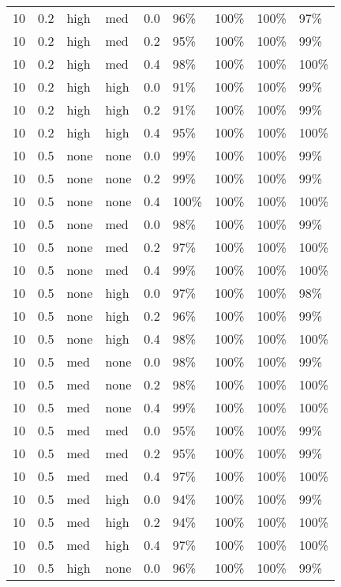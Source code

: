 \begin{longtable}{rrllrllll}
  10 & 0.2 & high & med & 0.0 & 96\% & 100\% & 100\% & 97\% \\ 
  10 & 0.2 & high & med & 0.2 & 95\% & 100\% & 100\% & 99\% \\ 
  10 & 0.2 & high & med & 0.4 & 98\% & 100\% & 100\% & 100\% \\ 
  10 & 0.2 & high & high & 0.0 & 91\% & 100\% & 100\% & 99\% \\ 
  10 & 0.2 & high & high & 0.2 & 91\% & 100\% & 100\% & 99\% \\ 
  10 & 0.2 & high & high & 0.4 & 95\% & 100\% & 100\% & 100\% \\ 
  10 & 0.5 & none & none & 0.0 & 99\% & 100\% & 100\% & 99\% \\ 
  10 & 0.5 & none & none & 0.2 & 99\% & 100\% & 100\% & 99\% \\ 
  10 & 0.5 & none & none & 0.4 & 100\% & 100\% & 100\% & 100\% \\ 
  10 & 0.5 & none & med & 0.0 & 98\% & 100\% & 100\% & 99\% \\ 
  10 & 0.5 & none & med & 0.2 & 97\% & 100\% & 100\% & 100\% \\ 
  10 & 0.5 & none & med & 0.4 & 99\% & 100\% & 100\% & 100\% \\ 
  10 & 0.5 & none & high & 0.0 & 97\% & 100\% & 100\% & 98\% \\ 
  10 & 0.5 & none & high & 0.2 & 96\% & 100\% & 100\% & 99\% \\ 
  10 & 0.5 & none & high & 0.4 & 98\% & 100\% & 100\% & 100\% \\ 
  10 & 0.5 & med & none & 0.0 & 98\% & 100\% & 100\% & 99\% \\ 
  10 & 0.5 & med & none & 0.2 & 98\% & 100\% & 100\% & 100\% \\ 
  10 & 0.5 & med & none & 0.4 & 99\% & 100\% & 100\% & 100\% \\ 
  10 & 0.5 & med & med & 0.0 & 95\% & 100\% & 100\% & 99\% \\ 
  10 & 0.5 & med & med & 0.2 & 95\% & 100\% & 100\% & 99\% \\ 
  10 & 0.5 & med & med & 0.4 & 97\% & 100\% & 100\% & 100\% \\ 
  10 & 0.5 & med & high & 0.0 & 94\% & 100\% & 100\% & 99\% \\ 
  10 & 0.5 & med & high & 0.2 & 94\% & 100\% & 100\% & 100\% \\ 
  10 & 0.5 & med & high & 0.4 & 97\% & 100\% & 100\% & 100\% \\ 
  10 & 0.5 & high & none & 0.0 & 96\% & 100\% & 100\% & 99\% \\ 

\end{longtable}
